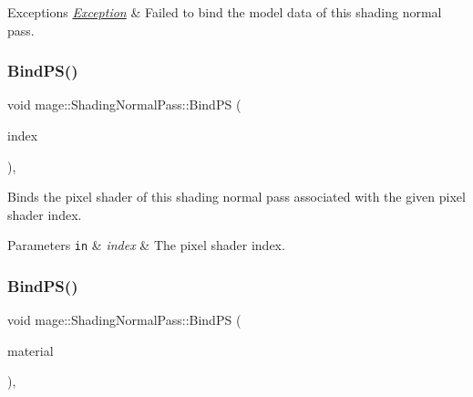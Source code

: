 \begin{DoxyExceptions}{Exceptions}
{\em \hyperlink{classmage_1_1_exception}{Exception}} & Failed to bind the model data of this shading normal pass. \\
\hline
\end{DoxyExceptions}
\hypertarget{classmage_1_1_shading_normal_pass_ab691c2125f9e21c7e70f2737037504bc}{}\label{classmage_1_1_shading_normal_pass_ab691c2125f9e21c7e70f2737037504bc} 
\subsubsection{\texorpdfstring{Bind\+P\+S()}{BindPS()}\hspace{0.1cm}{\footnotesize\ttfamily [1/2]}}
{\footnotesize\ttfamily void mage\+::\+Shading\+Normal\+Pass\+::\+Bind\+PS (\begin{DoxyParamCaption}\item[{\hyperlink{classmage_1_1_shading_normal_pass_a05bd054001817e1f57cd5cd41e2e522e}{P\+S\+Index}}]{index }\end{DoxyParamCaption})\hspace{0.3cm}{\ttfamily [private]}, {\ttfamily [noexcept]}}

Binds the pixel shader of this shading normal pass associated with the given pixel shader index.


\begin{DoxyParams}[1]{Parameters}
\mbox{\tt in}  & {\em index} & The pixel shader index. \\
\hline
\end{DoxyParams}
\hypertarget{classmage_1_1_shading_normal_pass_a220c66c7fdbbb16cfeb8515e435cd846}{}\label{classmage_1_1_shading_normal_pass_a220c66c7fdbbb16cfeb8515e435cd846} 
\subsubsection{\texorpdfstring{Bind\+P\+S()}{BindPS()}\hspace{0.1cm}{\footnotesize\ttfamily [2/2]}}
{\footnotesize\ttfamily void mage\+::\+Shading\+Normal\+Pass\+::\+Bind\+PS (\begin{DoxyParamCaption}\item[{const \hyperlink{classmage_1_1_material}{Material} \&}]{material }\end{DoxyParamCaption})\hspace{0.3cm}{\ttfamily [private]}, {\ttfamily [noexcept]}}

